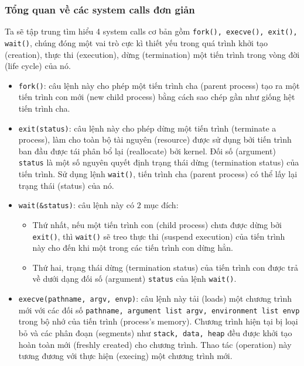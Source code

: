 \documentclass{article}
\begin{document}
\subsubsection{Tổng quan về các system calls đơn giản}
Ta sẽ tập trung tìm hiểu 4 system calls cơ bản gồm \verb|fork(), execve(), exit(), wait()|, chúng đóng một vai trò cực kì thiết yếu trong quá trình khởi tạo (creation), thực thi (execution), dừng (termination) một tiến trình trong vòng đời (life cycle) của nó.
\begin{itemize}
\item \verb|fork()|: câu lệnh này cho phép một tiến trình cha (parent process) tạo ra một tiến trình con mới (new child process) bằng cách sao chép gần như giống hệt tiến trình cha.
\item \verb|exit(status)|: câu lệnh này cho phép dừng một tiến trình (terminate a process), làm cho toàn bộ tài nguyên (resource) được sử dụng bởi tiến trình ban đầu  được tái phân bổ lại (reallocate) bởi kernel. Đối số (argument) \verb|status| là một số nguyên quyết định trạng thái dừng (termination status) của tiến trình. Sử dụng lệnh \verb|wait()|, tiến trình cha (parent process)
có thể lấy lại trạng thái (status) của nó.
\item \verb|wait(&status)|: câu lệnh này có $2$ mục đích:
\begin{itemize}
    \item Thứ nhất, nếu một tiến trình con (child process) chưa được dừng bởi \verb|exit()|, thì \verb|wait()| sẽ treo thực thi (suspend execution) của tiến trình này cho đến khi một trong các tiến trình con dừng hẳn.
    \item Thứ hai, trạng thái dừng (termination status) của tiến trình con được trả về dưới dạng đối số (argument) \verb|status| của lệnh \verb|wait()|.
\end{itemize}
\item \verb|execve(pathname, argv, envp)|: câu lệnh này tải (loads) một chương trình mới với các đối số \verb|pathname, argument list argv, environment list envp| trong bộ nhớ của tiến trình (process's memory). Chương trình hiện tại bị loại bỏ và các phân đoạn (segments) như \verb|stack, data, heap| đều được khởi tạo hoàn toàn mới
(freshly created) cho chương trình. Thao tác (operation) này tương đương với thực hiện (execing) một chương trình mới.
\end{itemize}
\end{document}
